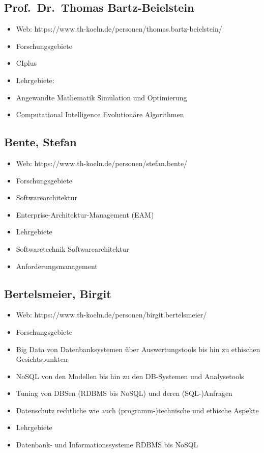 \subsection{Prof.~Dr.~Thomas
Bartz-Beielstein}\label{prof.dr.thomas-bartz-beielstein}

\begin{itemize}
\item
  Web: https://www.th-koeln.de/personen/thomas.bartz-beielstein/
\item
  Forschungsgebiete
\item
  CIplus
\item
  Lehrgebiete:
\item
  Angewandte Mathematik Simulation und Optimierung~
\item
  Computational Intelligence Evolutionäre Algorithmen
\end{itemize}

\subsection{Bente, Stefan}\label{bente-stefan}

\begin{itemize}
\item
  Web: https://www.th-koeln.de/personen/stefan.bente/
\item
  Forschungsgebiete
\item
  Softwarearchitektur
\item
  Enterprise-Architektur-Management (EAM)
\item
  Lehrgebiete
\item
  Softwaretechnik Softwarearchitektur
\item
  Anforderungsmanagement
\end{itemize}

\subsection{Bertelsmeier, Birgit}\label{bertelsmeier-birgit}

\begin{itemize}
\item
  Web: https://www.th-koeln.de/personen/birgit.bertelsmeier/
\item
  Forschungsgebiete
\item
  Big Data von Datenbanksystemen über Auswertungstools bis hin zu
  ethischen Gesichtspunkten
\item
  NoSQL von den Modellen bis hin zu den DB-Systemen und Analysetools
\item
  Tuning von DBSen (RDBMS bis NoSQL) und deren (SQL-)Anfragen
\item
  Datenschutz rechtliche wie auch (programm-)technische und ethische
  Aspekte
\item
  Lehrgebiete
\item
  Datenbank- und Informationssysteme RDBMS bis NoSQL
\end{itemize}

